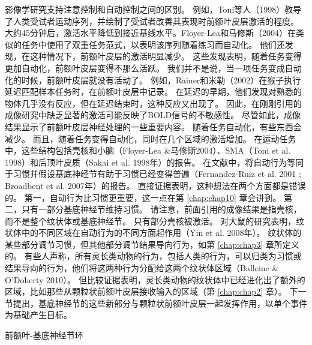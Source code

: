 影像学研究支持注意控制和自动控制之间的区别。
例如，Toni等人（1998）教导了人类受试者运动序列，并绘制了受试者改善其表现时前额叶皮层激活的程度。
大约45分钟后，激活水平降低到接近基线水平。Floyer-Lea和马修斯（2004）在类似的任务中使用了双重任务范式，以表明该序列随着练习而自动化。
他们还发现，在这种情况下，前额叶皮层的激活明显减少。
这些发现表明，随着任务变得更加自动化，前额叶皮层变得不那么活跃。
我们并不是说，当一项任务变成自动化的时候，前额叶皮层就没有活动了。
例如，Rainer和米勒（2002）在猴子执行延迟匹配样本任务时，在前额叶皮层中记录。
在延迟的早期，他们发现对熟悉的物体几乎没有反应，但在延迟结束时，这种反应又出现了。
因此，在刚刚引用的成像研究中缺乏显著的激活可能反映了BOLD信号的不敏感性。
尽管如此，成像结果显示了前额叶皮层神经处理的一些重要内容。
随着任务自动化，有些东西会减少。
而且，随着任务变得自动化，同时在几个区域的激活增加。
在运动任务中，这些结构包括壳核和小脑（Floyer-Lea \&马修斯2004）、SMA（Toni et al. 1998）和后顶叶皮质（Sakai et al. 1998年）的报告。
在文献中，将自动行为等同于习惯并假设基底神经节有助于习惯已经变得普遍（Fernandez-Ruiz et al. 2001 ; Broadbent et al. 2007年）的报告。
直接证据表明，这种想法在两个方面都是错误的。
第一，自动行为比习惯更重要，这一点在第 \ref{chap:chap10} 章会讲到。
第二，只有一部分基底神经节维持习惯。
请注意，前面引用的成像结果是指壳核，而不是整个纹状体或基底神经节。
只有部分壳核被激活。
对大鼠的研究表明，纹状体中的不同区域在自动行为的不同方面起作用（Yin et al. 2008年）。
纹状体的某些部分调节习惯，但其他部分调节结果导向行为，如第 \ref{chap:chap3} 章所定义的。
有些人声称，所有灵长类动物的行为，包括人类的行为，可以归类为习惯或结果导向的行为，他们将这两种行为分配给这两个纹状体区域（Balleine \& O'Doherty 2010）。
但比较证据表明，灵长类动物的纹状体中已经进化出了额外的区域，比如那些从颗粒状前额叶皮层接收输入的区域（第 \ref{chap:chap2} 章）。
下一节提出，基底神经节的这些新部分与颗粒状前额叶皮层一起发挥作用，以单个事件为基础产生目标。



前额叶-基底神经节环

